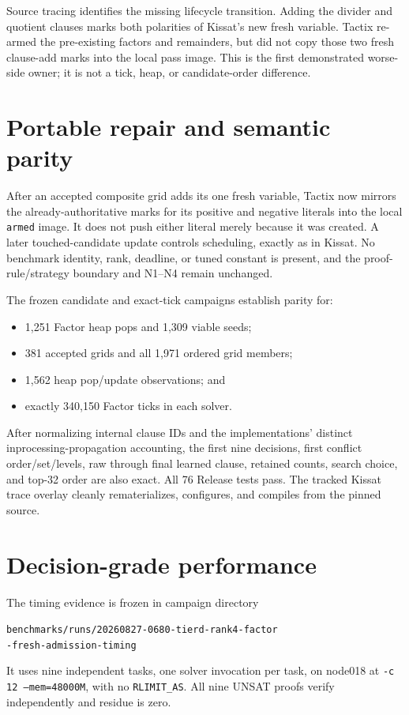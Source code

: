 \documentclass[11pt]{article}
\newcommand{\code}[1]{\texttt{#1}}
\begin{document}
Source tracing identifies the missing lifecycle transition.  Adding the
divider and quotient clauses marks both polarities of Kissat's new fresh
variable.  Tactix re-armed the pre-existing factors and remainders, but did not
copy those two fresh clause-add marks into the local pass image.  This is the
first demonstrated worse-side owner; it is not a tick, heap, or candidate-order
difference.

\section{Portable repair and semantic parity}

After an accepted composite grid adds its one fresh variable, Tactix now
mirrors the already-authoritative marks for its positive and negative literals
into the local \code{armed} image.  It does not push either literal merely
because it was created.  A later touched-candidate update controls scheduling,
exactly as in Kissat.  No benchmark identity, rank, deadline, or tuned constant
is present, and the proof-rule/strategy boundary and N1--N4 remain unchanged.

The frozen candidate and exact-tick campaigns establish parity for:

\begin{itemize}
  \item 1,251 Factor heap pops and 1,309 viable seeds;
  \item 381 accepted grids and all 1,971 ordered grid members;
  \item 1,562 heap pop/update observations; and
  \item exactly 340,150 Factor ticks in each solver.
\end{itemize}

After normalizing internal clause IDs and the implementations' distinct
inprocessing-propagation accounting, the first nine decisions, first conflict
order/set/levels, raw through final learned clause, retained counts, search
choice, and top-32 order are also exact.  All 76 Release tests pass.  The
tracked Kissat trace overlay cleanly rematerializes, configures, and compiles
from the pinned source.

\section{Decision-grade performance}

The timing evidence is frozen in campaign directory
\begin{center}
\small\code{benchmarks/runs/20260827-0680-tierd-rank4-factor}\\
\code{-fresh-admission-timing}
\end{center}
It uses nine independent tasks, one solver invocation per task, on node018 at
\code{-c 12 --mem=48000M}, with no \code{RLIMIT\_AS}.  All nine UNSAT proofs
verify independently and residue is zero.
\end{document}
